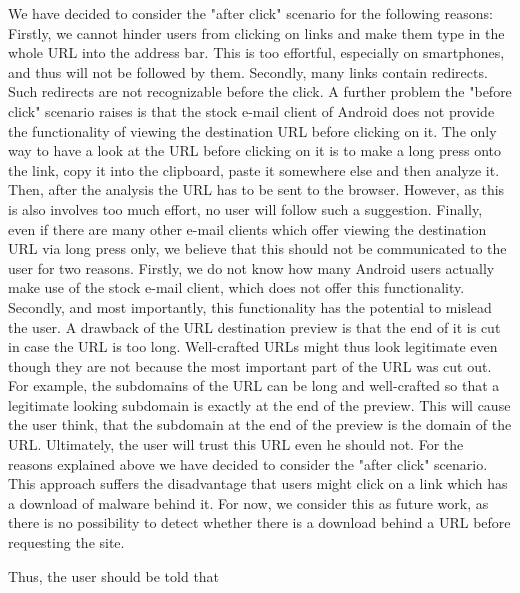 \begin{description}[leftmargin=0cm]
	\item["After Click" URL Analysis] We have decided to consider the "after click" scenario for the following reasons: Firstly, we cannot hinder users from clicking on links and make them type in the whole URL into the address bar.
 This is too effortful, especially on smartphones, and thus will not be followed by them.
 Secondly, many links contain redirects.
 Such redirects are not recognizable before the click.
 A further problem the "before click" scenario raises is that the stock e-mail client of Android does not provide the functionality of viewing the destination URL before clicking on it.
 The only way to have a look at the URL before clicking on it is to make a long press onto the link, copy it into the clipboard, paste it somewhere else and then analyze it.
 Then, after the analysis the URL has to be sent to the browser.
 However, as this is also involves too much effort, no user will follow such a suggestion.
 Finally, even if there are many other e-mail clients which offer viewing the destination URL via long press only, we believe that this should not be communicated to the user for two reasons.
 Firstly, we do not know how many Android users actually make use of the stock e-mail client, which does not offer this functionality.
 Secondly, and most importantly, this functionality has the potential to mislead the user.
 A drawback of the URL destination preview is that the end of it is cut in case the URL is too long.
 Well-crafted URLs might thus look legitimate even though they are not because the most important part of the URL was cut out.
 For example, the subdomains of the URL can be long and well-crafted so that a legitimate looking subdomain is exactly at the end of the preview.
 This will cause the user think, that the subdomain at the end of the preview is the domain of the URL.
 Ultimately, the user will trust this URL even he should not.
 For the reasons explained above we have decided to consider the "after click" scenario.
 This approach suffers the disadvantage that users might click on a link which has a download of malware behind it.
  For now, we consider this as future work, as there is no possibility to detect whether there is a download behind a URL before requesting the site.

 Thus, the user should be told that %


\end{description}
